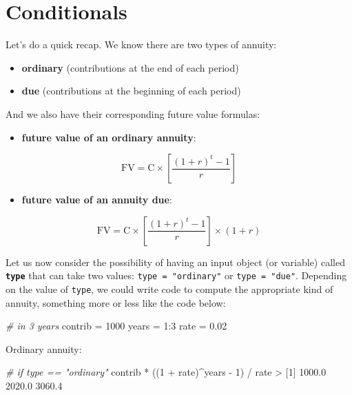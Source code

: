 \documentclass[
]{book}
\newenvironment{Shaded}{\begin{snugshade}}{\end{snugshade}}
\newcommand{\CommentTok}[1]{\textcolor[rgb]{0.56,0.35,0.01}{\textit{#1}}}
\newcommand{\DecValTok}[1]{\textcolor[rgb]{0.00,0.00,0.81}{#1}}
\newcommand{\FloatTok}[1]{\textcolor[rgb]{0.00,0.00,0.81}{#1}}
\newcommand{\NormalTok}[1]{#1}
\newcommand{\OtherTok}[1]{\textcolor[rgb]{0.56,0.35,0.01}{#1}}
\newcommand{\SpecialCharTok}[1]{\textcolor[rgb]{0.00,0.00,0.00}{#1}}
\providecommand{\tightlist}{%
  \setlength{\itemsep}{0pt}\setlength{\parskip}{0pt}}
\begin{document}
\hypertarget{conditionals-1}{%
\section{Conditionals}\label{conditionals-1}}

Let's do a quick recap. We know there are two types of annuity:

\begin{itemize}
\item
  \textbf{ordinary} (contributions at the end of each period)
\item
  \textbf{due} (contributions at the beginning of each period)
\end{itemize}

And we also have their corresponding future value formulas:

\begin{itemize}
\tightlist
\item
  \textbf{future value of an ordinary annuity}:
\end{itemize}

\[
\text{FV} = \text{C} \times \left [ \frac{(1 + r)^t - 1}{r} \right]
\]

\begin{itemize}
\tightlist
\item
  \textbf{future value of an annuity due}:
\end{itemize}

\[
\text{FV} = \text{C} \times \left [ \frac{(1 + r)^t - 1}{r} \right] \times (1 + r)
\]

Let us now consider the possibility of having an input object
(or variable) called \textbf{\texttt{type}} that can take two values:
\texttt{type\ =\ "ordinary"} or \texttt{type\ =\ "due"}. Depending on the value of
\texttt{type}, we could write code to compute the appropriate kind
of annuity, something more or less like the code below:

\begin{Shaded}
\begin{Highlighting}[]
\CommentTok{\# in 3 years}
\NormalTok{contrib }\OtherTok{=} \DecValTok{1000}
\NormalTok{years }\OtherTok{=} \DecValTok{1}\SpecialCharTok{:}\DecValTok{3}
\NormalTok{rate }\OtherTok{=} \FloatTok{0.02}
\end{Highlighting}
\end{Shaded}

Ordinary annuity:

\begin{Shaded}
\begin{Highlighting}[]
\CommentTok{\# if type == "ordinary"}
\NormalTok{contrib }\SpecialCharTok{*}\NormalTok{ ((}\DecValTok{1} \SpecialCharTok{+}\NormalTok{ rate)}\SpecialCharTok{\^{}}\NormalTok{years }\SpecialCharTok{{-}} \DecValTok{1}\NormalTok{) }\SpecialCharTok{/}\NormalTok{ rate}
\SpecialCharTok{\textgreater{}}\NormalTok{ [}\DecValTok{1}\NormalTok{] }\FloatTok{1000.0} \FloatTok{2020.0} \FloatTok{3060.4}
\end{Highlighting}
\end{Shaded}
\end{document}
